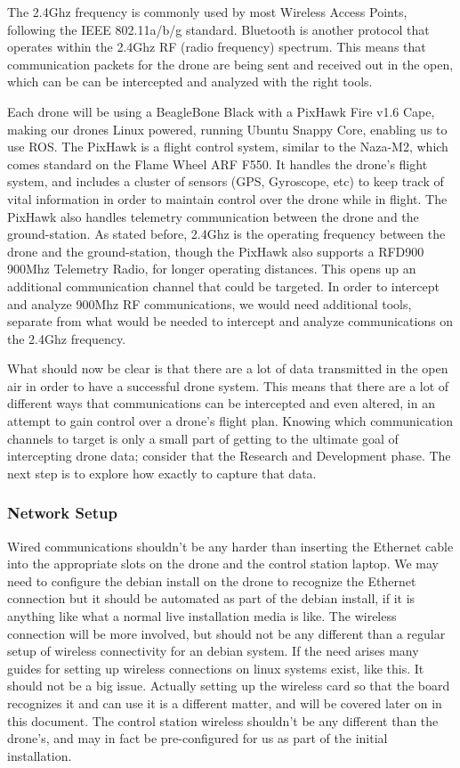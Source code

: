 \documentclass[IEEEtran,letterpaper,10pt,notitlepage,draftclsnofoot,onecolumn]{article}
\begin{document}
The 2.4Ghz frequency is commonly used by most Wireless Access Points, following the IEEE 802.11a/b/g
standard. Bluetooth is another protocol that operates within the 2.4Ghz RF (radio frequency)
spectrum\cite{HakDaSpectrum}. This means that communication packets for the drone are being sent and received out in the
open, which can be can be intercepted and analyzed with the right tools.

Each drone will be using a BeagleBone Black with a PixHawk Fire v1.6 Cape, making our drones Linux powered, running
Ubuntu Snappy Core, enabling us to use ROS\cite{PixHawk}. The PixHawk is a flight control system, similar to the
Naza-M2, which comes standard on the Flame Wheel ARF F550. It handles the drone's flight system, and includes a cluster
of sensors (GPS, Gyroscope, etc) to keep track of vital information in order to maintain control over the drone while
in flight. The PixHawk also handles telemetry communication between the drone and the ground-station. As stated before,
2.4Ghz is the operating frequency between the drone and the ground-station, though the PixHawk also supports a RFD900
900Mhz Telemetry Radio, for longer operating distances\cite{PixHawkDocs}. This opens up an additional communication
channel that could be targeted. In order to intercept and analyze 900Mhz RF communications, we would need additional
tools, separate from what would be needed to intercept and analyze communications on the 2.4Ghz
frequency\cite{HakDaSpectrum900}.

What should now be clear is that there are a lot of data transmitted in the open air in order to have a successful
drone system. This means that there are a lot of different ways that communications can be intercepted and even
altered, in an attempt to gain control over a drone's flight plan. Knowing which communication channels to target
is only a small part of getting to the ultimate goal of intercepting drone data; consider that the Research and
Development phase. The next step is to explore how exactly to capture that data.

\subsubsection{Network Setup}
Wired communications shouldn't be any harder than inserting the Ethernet cable into the appropriate slots on the drone and the control station laptop. 
We may need to configure the debian install on the drone to recognize the Ethernet connection but it should be automated as part of the debian install, if it is anything like what a normal live installation media is like.
The wireless connection will be more involved, but should not be any different than a regular setup of wireless connectivity for an debian system. 
If the need arises many guides for setting up wireless connections on linux systems exist, like this. \cite{wirelessconfig} 
It should not be a big issue. 
Actually setting up the wireless card so that the board recognizes it and can use it is a different matter, and will be covered later on in this document. 
The control station wireless shouldn't be any different than the drone's, and may in fact be pre-configured for us as part of the initial installation.
\end{document}
